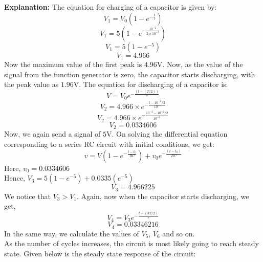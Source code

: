 \documentclass[a4paper,12pt]{article}
\begin{document}
\textbf{Explanation:}
The equation for charging of a capacitor is given by:
$$V_1=V_0(1-e^{-\frac{t}{\tau}})$$
$$V_1=5(1-e^{-\frac{10^{-2}}{2\times 10^{-3}}})$$
$$V_1=5(1-e^{-5})$$
$$V_1=4.966$$
Now the maximum value of the first peak is $4.96$V. 
Now, as the value of the signal from the function generator is zero, the capacitor starts discharging, with the peak value as $1.96$V.
The equation for discharging of a capacitor is:
$$V=V_0e^{-\frac{(t-(T/2))}{\tau}}$$
$$V_2=4.966 \times e^{-\frac{t-10^{-2}/2}{10^{-}}}$$
$$V_2=4.966 \times e^{-\frac{10^{-2}-10^{-2}/2}{10^{-3}}}$$
$$V_2=0.0334606$$
Now, we again send a signal of $5$V.
On solving the differential equation corresponding to a series RC circuit with initial conditions, we get:\\
$$v=V(1-e^{-\frac{t-t_0}{RC}})+v_0e^{-\frac{(t-t_0)}{RC}}$$
Here, $v_0=0.0334606$\\
Hence, 
$V_3=5(1-e^{-5})+0.0335(e^{-5})$
$$V_3=4.966225$$
We notice that $V_3 > V_1$.
Again, now when the capacitor starts discharging, we get,
$$V_4=V_3e^{-\frac{t-(3T/2)}{\tau}}$$
$$V_4=0.03346216$$
In the same way, we calculate the values of $V_5$, $V_6$ and so on.\\
As the number of cycles increases, the circuit is most likely going to reach steady state.
Given below is the steady state response of the circuit:
\end{document}
